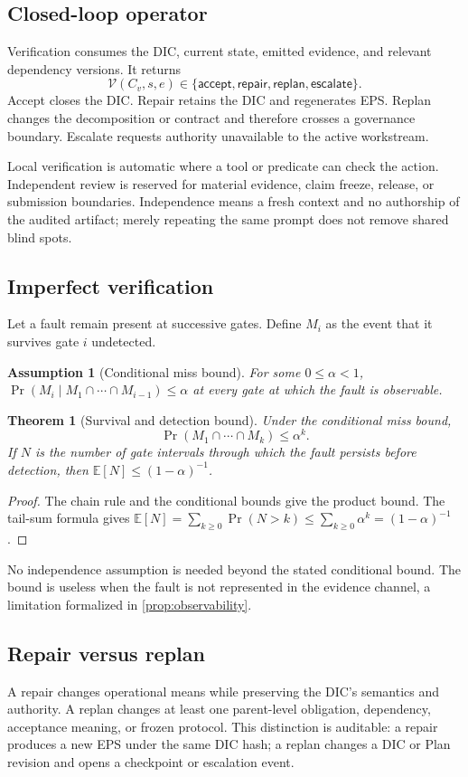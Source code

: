 \documentclass[11pt,a4paper]{article}
\newtheorem{assumption}[definition]{Assumption}
\newtheorem{theorem}[definition]{Theorem}
\begin{document}
\subsection{Closed-loop operator}
Verification consumes the DIC, current state, emitted evidence, and relevant dependency versions. It returns
\[
\mathcal V(C_v,s,e)\in\{\textsf{accept},\textsf{repair},\textsf{replan},\textsf{escalate}\}.
\]
\textsf{Accept} closes the DIC. \textsf{Repair} retains the DIC and regenerates EPS. \textsf{Replan} changes the decomposition or contract and therefore crosses a governance boundary. \textsf{Escalate} requests authority unavailable to the active workstream.

Local verification is automatic where a tool or predicate can check the action. Independent review is reserved for material evidence, claim freeze, release, or submission boundaries. Independence means a fresh context and no authorship of the audited artifact; merely repeating the same prompt does not remove shared blind spots.

\subsection{Imperfect verification}
Let a fault remain present at successive gates. Define $M_i$ as the event that it survives gate $i$ undetected.
\begin{assumption}[Conditional miss bound]
For some $0\le\alpha<1$,
$\Pr(M_i\mid M_1\cap\cdots\cap M_{i-1})\le\alpha$ at every gate at which the fault is observable.
\end{assumption}
\begin{theorem}[Survival and detection bound]
\label{thm:miss}
Under the conditional miss bound,
\[
\Pr(M_1\cap\cdots\cap M_k)\le\alpha^k.
\]
If $N$ is the number of gate intervals through which the fault persists before detection, then $\mathbb E[N]\le(1-\alpha)^{-1}$.
\end{theorem}
\begin{proof}
The chain rule and the conditional bounds give the product bound. The tail-sum formula gives
$\mathbb E[N]=\sum_{k\ge0}\Pr(N>k)\le\sum_{k\ge0}\alpha^k=(1-\alpha)^{-1}$.
\end{proof}
No independence assumption is needed beyond the stated conditional bound. The bound is useless when the fault is not represented in the evidence channel, a limitation formalized in \cref{prop:observability}.

\subsection{Repair versus replan}
A repair changes operational means while preserving the DIC's semantics and authority. A replan changes at least one parent-level obligation, dependency, acceptance meaning, or frozen protocol. This distinction is auditable: a repair produces a new EPS under the same DIC hash; a replan changes a DIC or Plan revision and opens a checkpoint or escalation event.
\end{document}

